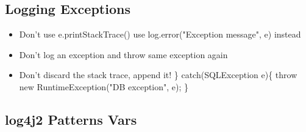 \documentclass[10pt]{article}
\begin{document}
	\subsection{Logging Exceptions}
	\begin{itemize}
		\item Don't use e.printStackTrace() use log.error("Exception message", e) instead
		\item Don't log an exception and throw same exception again
		\item Don't discard the stack trace, append it!
			\subitem \} catch(SQLException e)\{
						throw new RuntimeException("DB exception", e);
						\}
	\end{itemize}
	\newpage
	\subsection{log4j2 Patterns Vars}
\end{document}
